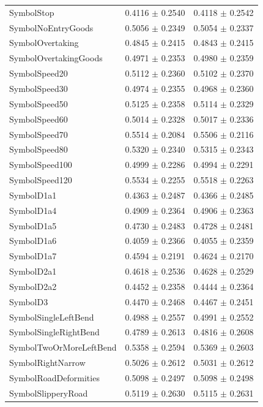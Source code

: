 \begin{longtable}{@{}lrr@{}}
SymbolStop & 0.4116 $\pm$ 0.2540 & 0.4118 $\pm$ 0.2542 \\
SymbolNoEntryGoods & 0.5056 $\pm$ 0.2349 & 0.5054 $\pm$ 0.2337 \\
SymbolOvertaking & 0.4845 $\pm$ 0.2415 & 0.4843 $\pm$ 0.2415 \\
SymbolOvertakingGoods & 0.4971 $\pm$ 0.2353 & 0.4980 $\pm$ 0.2359 \\
SymbolSpeed20 & 0.5112 $\pm$ 0.2360 & 0.5102 $\pm$ 0.2370 \\
SymbolSpeed30 & 0.4974 $\pm$ 0.2355 & 0.4968 $\pm$ 0.2360 \\
SymbolSpeed50 & 0.5125 $\pm$ 0.2358 & 0.5114 $\pm$ 0.2329 \\
SymbolSpeed60 & 0.5014 $\pm$ 0.2328 & 0.5017 $\pm$ 0.2336 \\
SymbolSpeed70 & 0.5514 $\pm$ 0.2084 & 0.5506 $\pm$ 0.2116 \\
SymbolSpeed80 & 0.5320 $\pm$ 0.2340 & 0.5315 $\pm$ 0.2343 \\
SymbolSpeed100 & 0.4999 $\pm$ 0.2286 & 0.4994 $\pm$ 0.2291 \\
SymbolSpeed120 & 0.5534 $\pm$ 0.2255 & 0.5518 $\pm$ 0.2263 \\
SymbolD1a1 & 0.4363 $\pm$ 0.2487 & 0.4366 $\pm$ 0.2485 \\
SymbolD1a4 & 0.4909 $\pm$ 0.2364 & 0.4906 $\pm$ 0.2363 \\
SymbolD1a5 & 0.4730 $\pm$ 0.2483 & 0.4728 $\pm$ 0.2481 \\
SymbolD1a6 & 0.4059 $\pm$ 0.2366 & 0.4055 $\pm$ 0.2359 \\
SymbolD1a7 & 0.4594 $\pm$ 0.2191 & 0.4624 $\pm$ 0.2170 \\
SymbolD2a1 & 0.4618 $\pm$ 0.2536 & 0.4628 $\pm$ 0.2529 \\
SymbolD2a2 & 0.4452 $\pm$ 0.2358 & 0.4444 $\pm$ 0.2364 \\
SymbolD3 & 0.4470 $\pm$ 0.2468 & 0.4467 $\pm$ 0.2451 \\
SymbolSingleLeftBend & 0.4988 $\pm$ 0.2557 & 0.4991 $\pm$ 0.2552 \\
SymbolSingleRightBend & 0.4789 $\pm$ 0.2613 & 0.4816 $\pm$ 0.2608 \\
SymbolTwoOrMoreLeftBend & 0.5358 $\pm$ 0.2594 & 0.5369 $\pm$ 0.2603 \\
SymbolRightNarrow & 0.5026 $\pm$ 0.2612 & 0.5031 $\pm$ 0.2612 \\
SymbolRoadDeformities & 0.5098 $\pm$ 0.2497 & 0.5098 $\pm$ 0.2498 \\
SymbolSlipperyRoad & 0.5119 $\pm$ 0.2630 & 0.5115 $\pm$ 0.2631 \\

\end{longtable}
